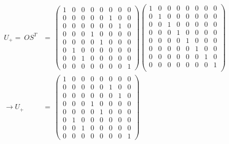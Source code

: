 \begin{equation}
    \begin{split}
        U_{+} =\ OS^T &=\ \begin{pmatrix}
        1 & 0 & 0 & 0 & 0 & 0 & 0 & 0\\
        0 & 0 & 0 & 0 & 0 & 1 & 0 & 0\\
        0 & 0 & 0 & 0 & 0 & 0 & 1 & 0\\
        0 & 0 & 0 & 1 & 0 & 0 & 0 & 0\\
        0 & 0 & 0 & 0 & 1 & 0 & 0 & 0\\
        0 & 1 & 0 & 0 & 0 & 0 & 0 & 0\\
        0 & 0 & 1 & 0 & 0 & 0 & 0 & 0\\
        0 & 0 & 0 & 0 & 0 & 0 & 0 &1
        \end{pmatrix}\begin{pmatrix}
         1 & 0 & 0 & 0 & 0 & 0 & 0 & 0\\
         0 & 1 & 0 & 0 & 0 & 0 & 0 & 0\\ 
         0 & 0 & 1 & 0 & 0 & 0 & 0 & 0\\
         0 & 0 & 0 & 1 & 0 & 0 & 0 & 0\\
         0 & 0 & 0 & 0 & 1 & 0 & 0 & 0\\
         0 & 0 & 0 & 0 & 0 & 1 & 0 & 0\\
         0 & 0 & 0 & 0 & 0 & 0 & 1 & 0\\
         0 & 0 & 0 & 0 & 0 & 0 & 0 & 1\\
        \end{pmatrix} \\ 
        \rightarrow U_{+} &=\ \begin{pmatrix}
        1 & 0 & 0 & 0 & 0 & 0 & 0 & 0\\
        0 & 0 & 0 & 0 & 0 & 1 & 0 & 0\\
        0 & 0 & 0 & 0 & 0 & 0 & 1 & 0\\
        0 & 0 & 0 & 1 & 0 & 0 & 0 & 0\\
        0 & 0 & 0 & 0 & 1 & 0 & 0 & 0\\
        0 & 1 & 0 & 0 & 0 & 0 & 0 & 0\\
        0 & 0 & 1 & 0 & 0 & 0 & 0 & 0\\
        0 & 0 & 0 & 0 & 0 & 0 & 0 &1
        \end{pmatrix}
    \end{split}
    \label{equation:addition_matrix_solved}
\end{equation}
\newpage

